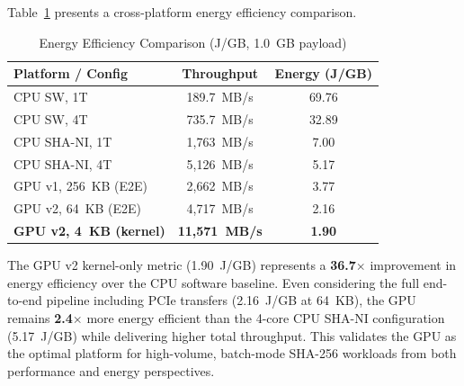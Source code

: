 Table~\ref{tab:energy_comparison} presents a cross-platform energy efficiency comparison.

\begin{table}[htbp]
\centering
\caption{Energy Efficiency Comparison (J/GB, 1.0~GB payload)}
\label{tab:energy_comparison}
\begin{tabular}{lcc}
\hline\hline
\textbf{Platform / Config} & \textbf{Throughput} & \textbf{Energy (J/GB)} \\
\hline
CPU SW, 1T              & 189.7~MB/s  & 69.76 \\
CPU SW, 4T              & 735.7~MB/s  & 32.89 \\
CPU SHA-NI, 1T          & 1,763~MB/s  & 7.00  \\
CPU SHA-NI, 4T          & 5,126~MB/s  & 5.17  \\
GPU v1, 256~KB (E2E)    & 2,662~MB/s  & 3.77  \\
GPU v2, 64~KB (E2E)     & 4,717~MB/s  & 2.16  \\
\textbf{GPU v2, 4~KB (kernel)} & \textbf{11,571~MB/s} & \textbf{1.90}  \\
\hline\hline
\end{tabular}
\end{table}

The GPU v2 kernel-only metric (1.90~J/GB) represents a \textbf{36.7$\times$} improvement in energy efficiency over the CPU software baseline. Even considering the full end-to-end pipeline including PCIe transfers (2.16~J/GB at 64~KB), the GPU remains \textbf{2.4$\times$} more energy efficient than the 4-core CPU SHA-NI configuration (5.17~J/GB) while delivering higher total throughput. This validates the GPU as the optimal platform for high-volume, batch-mode SHA-256 workloads from both performance and energy perspectives.

